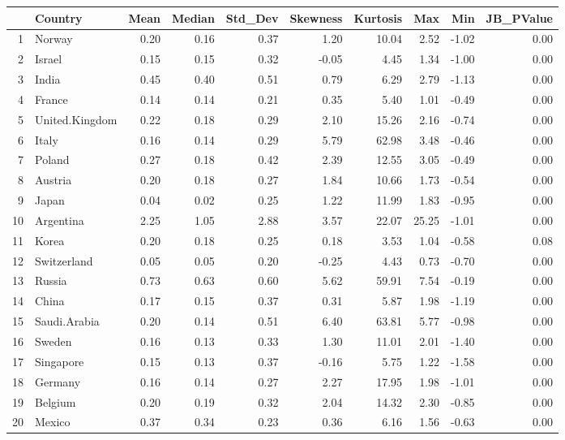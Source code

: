 \begin{table}[ht]
\centering
\begin{tabular}{rlrrrrrrrr}
  \hline
 & Country & Mean & Median & Std\_Dev & Skewness & Kurtosis & Max & Min & JB\_PValue \\ 
  \hline
1 & Norway & 0.20 & 0.16 & 0.37 & 1.20 & 10.04 & 2.52 & -1.02 & 0.00 \\ 
  2 & Israel & 0.15 & 0.15 & 0.32 & -0.05 & 4.45 & 1.34 & -1.00 & 0.00 \\ 
  3 & India & 0.45 & 0.40 & 0.51 & 0.79 & 6.29 & 2.79 & -1.13 & 0.00 \\ 
  4 & France & 0.14 & 0.14 & 0.21 & 0.35 & 5.40 & 1.01 & -0.49 & 0.00 \\ 
  5 & United.Kingdom & 0.22 & 0.18 & 0.29 & 2.10 & 15.26 & 2.16 & -0.74 & 0.00 \\ 
  6 & Italy & 0.16 & 0.14 & 0.29 & 5.79 & 62.98 & 3.48 & -0.46 & 0.00 \\ 
  7 & Poland & 0.27 & 0.18 & 0.42 & 2.39 & 12.55 & 3.05 & -0.49 & 0.00 \\ 
  8 & Austria & 0.20 & 0.18 & 0.27 & 1.84 & 10.66 & 1.73 & -0.54 & 0.00 \\ 
  9 & Japan & 0.04 & 0.02 & 0.25 & 1.22 & 11.99 & 1.83 & -0.95 & 0.00 \\ 
  10 & Argentina & 2.25 & 1.05 & 2.88 & 3.57 & 22.07 & 25.25 & -1.01 & 0.00 \\ 
  11 & Korea & 0.20 & 0.18 & 0.25 & 0.18 & 3.53 & 1.04 & -0.58 & 0.08 \\ 
  12 & Switzerland & 0.05 & 0.05 & 0.20 & -0.25 & 4.43 & 0.73 & -0.70 & 0.00 \\ 
  13 & Russia & 0.73 & 0.63 & 0.60 & 5.62 & 59.91 & 7.54 & -0.19 & 0.00 \\ 
  14 & China & 0.17 & 0.15 & 0.37 & 0.31 & 5.87 & 1.98 & -1.19 & 0.00 \\ 
  15 & Saudi.Arabia & 0.20 & 0.14 & 0.51 & 6.40 & 63.81 & 5.77 & -0.98 & 0.00 \\ 
  16 & Sweden & 0.16 & 0.13 & 0.33 & 1.30 & 11.01 & 2.01 & -1.40 & 0.00 \\ 
  17 & Singapore & 0.15 & 0.13 & 0.37 & -0.16 & 5.75 & 1.22 & -1.58 & 0.00 \\ 
  18 & Germany & 0.16 & 0.14 & 0.27 & 2.27 & 17.95 & 1.98 & -1.01 & 0.00 \\ 
  19 & Belgium & 0.20 & 0.19 & 0.32 & 2.04 & 14.32 & 2.30 & -0.85 & 0.00 \\ 
  20 & Mexico & 0.37 & 0.34 & 0.23 & 0.36 & 6.16 & 1.56 & -0.63 & 0.00 \\ 

\end{tabular}
\end{table}
